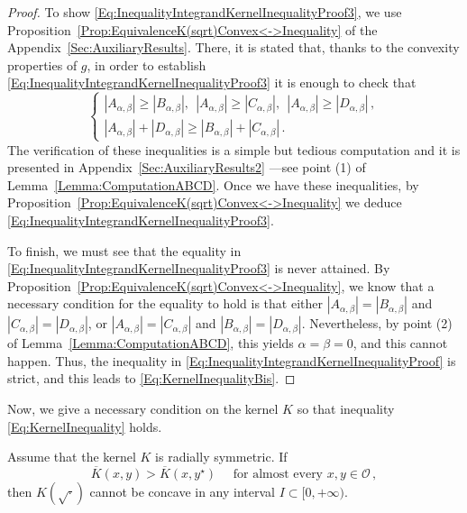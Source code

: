 \begin{proof}
To show \eqref{Eq:InequalityIntegrandKernelInequalityProof3}, we use Proposition~\ref{Prop:EquivalenceK(sqrt)Convex<->Inequality} of the Appendix~\ref{Sec:AuxiliaryResults}. There, it is stated that, thanks to the convexity properties of $g$, in order to establish \eqref{Eq:InequalityIntegrandKernelInequalityProof3} it is enough to check that
$$
\begin{cases}
|A_{\alpha,\beta}| \geq |B_{\alpha,\beta}|,\ \ |A_{\alpha,\beta}| \geq |C_{\alpha,\beta}|, \ \ |A_{\alpha,\beta}| \geq |D_{\alpha,\beta}|\,, \\
|A_{\alpha,\beta}| + |D_{\alpha,\beta}| \geq |B_{\alpha,\beta}| + |C_{\alpha,\beta}|\,.
\end{cases}
$$
The verification of these inequalities is a simple but tedious computation and it is presented in Appendix~\ref{Sec:AuxiliaryResults2} ---see point (1) of Lemma~\ref{Lemma:ComputationABCD}. Once we have these inequalities, by Proposition~\ref{Prop:EquivalenceK(sqrt)Convex<->Inequality} we deduce \eqref{Eq:InequalityIntegrandKernelInequalityProof3}.

To finish, we must see that the equality in \eqref{Eq:InequalityIntegrandKernelInequalityProof3} is never attained. By Proposition~\ref{Prop:EquivalenceK(sqrt)Convex<->Inequality}, we know that a necessary condition for the equality to hold is that either $|A_{\alpha,\beta}| = |B_{\alpha,\beta}|$ and $|C_{\alpha,\beta}| = |D_{\alpha,\beta}|$, or $|A_{\alpha,\beta}| = |C_{\alpha,\beta}|$ and $|B_{\alpha,\beta}| = |D_{\alpha,\beta}|$. Nevertheless, by point (2) of Lemma~\ref{Lemma:ComputationABCD}, this yields $\alpha = \beta = 0$, and this cannot happen. Thus, the inequality in \eqref{Eq:InequalityIntegrandKernelInequalityProof} is strict, and this leads to \eqref{Eq:KernelInequalityBis}.
\end{proof}


Now, we give a necessary condition on the kernel $K$ so that inequality \eqref{Eq:KernelInequality} holds.

\begin{proposition}
\label{Prop:KernelInequalityNecessaryCondition} Assume that the kernel $K$ is radially symmetric. If
\begin{equation}
\label{Eq:KernelInequalityAE}
\overline{K}(x,y) > \overline{K}(x, y^\star) \quad \text{ for almost every }x,y \in \mathcal{O}\,,
\end{equation}
then $K(\sqrt{\cdot})$ cannot be concave in any interval $I\subset [0,+\infty)$.
\end{proposition}

